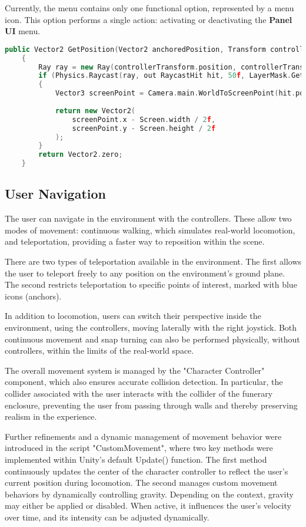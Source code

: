Currently, the menu contains only one functional option, represented by a menu icon. This option performs a single action: activating or deactivating the \textbf{Panel \gls{UI}} menu.

\begin{lstlisting}[language=C++, caption={Method used to get the position that was pointed by the controller ray.}, label={lst:menu_raycast}]
    public Vector2 GetPosition(Vector2 anchoredPosition, Transform controllerTransform)
    {
        Ray ray = new Ray(controllerTransform.position, controllerTransform.forward);
        if (Physics.Raycast(ray, out RaycastHit hit, 50f, LayerMask.GetMask("Default")))
        {
            Vector3 screenPoint = Camera.main.WorldToScreenPoint(hit.point);
            
            return new Vector2(
                screenPoint.x - Screen.width / 2f,
                screenPoint.y - Screen.height / 2f
            );
        }
        return Vector2.zero;
    }
\end{lstlisting}


\subsection*{User Navigation}
The user can navigate in the environment with the controllers. 
These allow two modes of movement: continuous walking, which simulates real-world locomotion, and teleportation, providing a faster way to reposition within the scene.

There are two types of teleportation available in the environment. The first allows the user to teleport freely to any position on the environment’s ground plane. The second restricts teleportation to specific points of interest, marked with blue icons (anchors).

In addition to locomotion, users can switch their perspective inside the environment, using the controllers, moving laterally with the right joystick.
Both continuous movement and snap turning can also be performed physically, without controllers, within the limits of the real-world space.

The overall movement system is managed by the "Character Controller" component, which also ensures accurate collision detection. In particular, the collider associated with the user interacts with the collider of the funerary enclosure, preventing the user from passing through walls and thereby preserving realism in the experience.

Further refinements and a dynamic management of movement behavior were introduced in the script "CustomMovement", where two key methods were implemented within Unity’s default Update() function.
The first method continuously updates the center of the character controller to reflect the user’s current position during locomotion. 
The second manages custom movement behaviors by dynamically controlling gravity. Depending on the context, gravity may either be applied or disabled. When active, it influences the user’s velocity over time, and its intensity can be adjusted dynamically.

